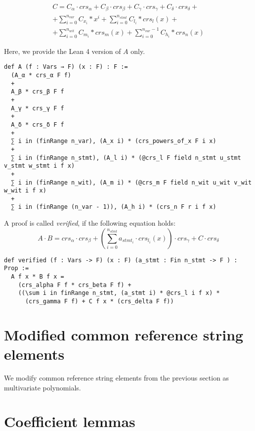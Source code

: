 \documentclass{article}
\theoremstyle{definition}
\theoremstyle{remark}
\begin{document}
\begin{multline}
C = C_{\alpha} \cdot crs_{\alpha} + C_{\beta} \cdot crs_{\beta} + C_{\gamma} \cdot crs_{\gamma} + C_{\delta} \cdot crs_{\delta} + \\
    + \sum \limits_{i = 0}^{n_{var}} C_{x_i} * x^i + \sum \limits_{i = 0}^{n_{stmt}} C_{l_i} * crs_l(x) + \\
    + \sum \limits_{i = 0}^{n_{wit}} C_{m_i} * crs_m(x) + \sum \limits_{i = 0}^{n_{var} - 1} C_{h_i} * crs_n(x)
\end{multline}

Here, we provide the Lean 4 version of $A$ only.

\begin{lstlisting}
def A (f : Vars → F) (x : F) : F :=
  (A_α * crs_α F f)
  +
  A_β * crs_β F f
  +
  A_γ * crs_γ F f
  +
  A_δ * crs_δ F f
  +
  ∑ i in (finRange n_var), (A_x i) * (crs_powers_of_x F i x)
  +
  ∑ i in (finRange n_stmt), (A_l i) * (@crs_l F field n_stmt u_stmt v_stmt w_stmt i f x)
  +
  ∑ i in (finRange n_wit), (A_m i) * (@crs_m F field n_wit u_wit v_wit w_wit i f x)
  +
  ∑ i in (finRange (n_var - 1)), (A_h i) * (crs_n F r i f x)
\end{lstlisting}

A proof is called \emph{verified}, if the following equation holds:
\begin{equation}
A \cdot B = crs_{\alpha} \cdot crs_{\beta} + \left(\sum \limits_{i = 0}^{n_{stmt}} a_{{stmt}_i} \cdot crs_{l_i}(x) \right) \cdot crs_{\gamma} + C \cdot crs_{\delta}
\end{equation}

\begin{lstlisting}
def verified (f : Vars -> F) (x : F) (a_stmt : Fin n_stmt -> F ) : Prop :=
  A f x * B f x =
    (crs_alpha F f * crs_beta F f) +
    ((\sum i in finRange n_stmt, (a_stmt i) * @crs_l i f x) *
      (crs_gamma F f) + C f x * (crs_delta F f))
\end{lstlisting}

\section{Modified common reference string elements}

We modify common reference string elements from the previous section as multivariate polynomials.

\section{Coefficient lemmas}
\end{document}
